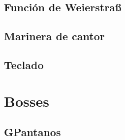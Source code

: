 \documentclass[letterpaper]{article}
\begin{document}
\subsection{Función de Weierstra{\ss}} %
\subsection{Marinera de cantor}
\subsection{Teclado}

\section{Bosses}
\subsection{GPantanos}
\end{document}
